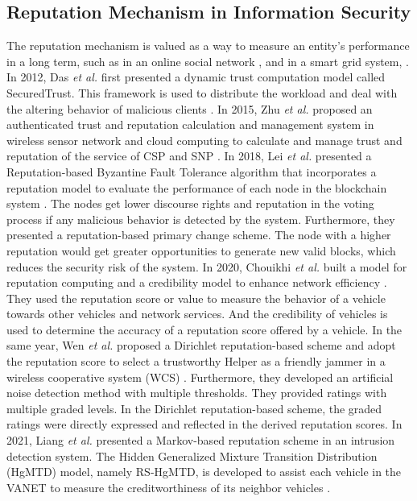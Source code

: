 \documentclass[journal]{IEEEtran}
\begin{document}
\subsection{Reputation Mechanism in Information Security}
The reputation mechanism is valued as a way to measure an entity's performance in a long term, such as in an online social network \cite{ref_27_reputation}, and in a smart grid system, \cite{ref_41_reputation, ref_44_reputation}.
In 2012, Das \textit{et al.} first presented a dynamic trust computation model called SecuredTrust. This framework is used to distribute the workload and deal with the altering behavior of malicious clients \cite{ref_48_reputation}.
In 2015, Zhu \textit{et al.} proposed an authenticated trust and reputation calculation and management system in wireless sensor network and cloud computing to calculate and manage trust and reputation of the service of CSP and SNP \cite{ref_47_reputation}.
In 2018, Lei \textit{et al.} presented a Reputation-based Byzantine Fault Tolerance algorithm that incorporates a reputation model to evaluate the performance of each node in the blockchain system \cite{ref_25_reputation}. The nodes get lower discourse rights and reputation in the voting process if any malicious behavior is detected by the system. Furthermore, they presented a reputation-based primary change scheme. The node with a higher reputation would get greater opportunities to generate new valid blocks, which reduces the security risk of the system.
In 2020, Chouikhi \textit{et al.} built a model for reputation computing and a credibility model to enhance network efficiency \cite{ref_23_reputation}. They used the reputation score or value to measure the behavior of a vehicle towards other vehicles and network services. And the credibility of vehicles is used to determine the accuracy of a reputation score offered by a vehicle. 
In the same year, Wen \textit{et al.} proposed a Dirichlet reputation-based scheme and adopt the reputation score to select a trustworthy Helper as a friendly jammer in a wireless cooperative system (WCS) \cite{ref_24_reputation}. Furthermore, they developed an artificial noise detection method with multiple thresholds. They provided ratings with multiple graded levels. In the Dirichlet reputation-based scheme, the graded ratings were directly expressed and reflected in the derived reputation scores.
In 2021, Liang \textit{et al.} presented a Markov-based reputation scheme in an intrusion detection system. The Hidden Generalized Mixture Transition Distribution (HgMTD) model, namely RS-HgMTD, is developed to assist each vehicle in the VANET to measure the creditworthiness of its neighbor vehicles \cite{ref_46_reputation}.
\end{document}
